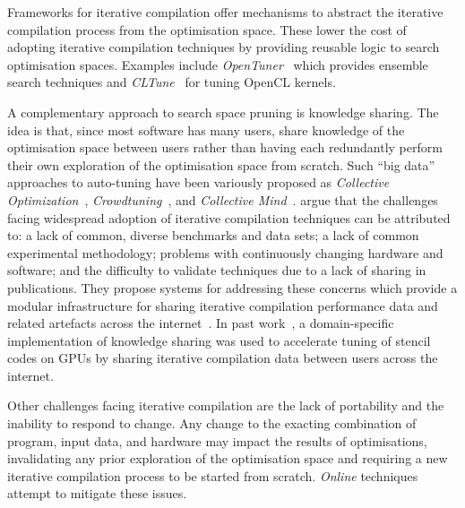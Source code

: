 Frameworks for iterative compilation offer mechanisms to abstract the iterative compilation process from the optimisation space. These lower the cost of adopting iterative compilation techniques by providing reusable logic to search optimisation spaces. Examples include \emph{OpenTuner}~\cite{Ansel2013} which provides ensemble search techniques and \emph{CLTune}~\cite{Nugteren2015} for tuning OpenCL kernels.

A complementary approach to search space pruning is knowledge sharing. The idea is that, since most software has many users, share knowledge of the optimisation space between users rather than having each redundantly perform their own exploration of the optimisation space from scratch. Such ``big data'' approaches to auto-tuning have been variously proposed as
\emph{Collective Optimization}~\cite{Saclay2010},
\emph{Crowdtuning}~\cite{Memon2013},
and \emph{Collective Mind}~\cite{Fursin2014}.
\citeauthor{Fursin2014} argue that the challenges facing widespread adoption of iterative compilation techniques can be attributed to: a lack of common, diverse benchmarks and data sets; a lack of common experimental methodology; problems with continuously changing hardware and software; and the difficulty to validate techniques due to a lack of sharing in publications. They propose systems for addressing these concerns which provide a modular infrastructure for sharing iterative compilation performance data and related artefacts across the internet~\cite{Fursin2014}.
In past work~\cite{Cummins2016}, a domain-specific implementation of knowledge sharing was used to accelerate tuning of stencil codes on GPUs by sharing iterative compilation data between users across the internet.

Other challenges facing iterative compilation are the lack of portability and the inability to respond to change. Any change to the exacting combination of program, input data, and hardware may impact the results of optimisations, invalidating any prior exploration of the optimisation space and requiring a new iterative compilation process to be started from scratch. \emph{Online} techniques attempt to mitigate these issues.


